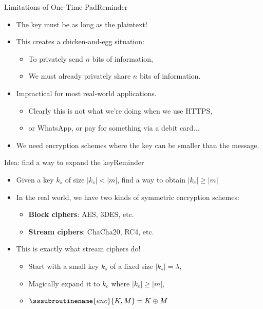 \documentclass[aspectratio=169, lualatex, handout]{beamer}
\begin{document}
\begin{frame}{Limitations of One-Time Pad}{Reminder}
	\begin{itemize}[<+->]
		\item The key must be as long as the plaintext!
		\item This creates a chicken-and-egg situation:
		      \begin{itemize}[<+->]
			      \item To privately send $n$ bits of information,
			      \item We must already privately share $n$ bits of information.
		      \end{itemize}
		\item Impractical for most real-world applications.
		      \begin{itemize}[<+->]
			      \item Clearly this is not what we're doing when we use HTTPS,
			      \item or WhatsApp, or pay for something via a debit card...
		      \end{itemize}
		\item We need encryption schemes where the key can be smaller than the message.
	\end{itemize}
\end{frame}

\begin{frame}{Idea: find a way to expand the key}{Reminder}
	\begin{itemize}[<+->]
		\item Given a key $k_s$ of size $\left|k_s\right| < \left|m\right|$, find a way to obtain $\left|k_e\right| \geq \left|m\right|$
		\item In the real world, we have two kinds of symmetric encryption schemes:
		      \begin{itemize}[<+->]
			      \item \textbf{Block ciphers}: AES, 3DES, etc.
			      \item \textbf{Stream ciphers}: ChaCha20, RC4, etc.
		      \end{itemize}
		\item This is exactly what stream ciphers do!
		      \begin{itemize}[<+->]
			      \item Start with a small key $k_s$ of a fixed size $\left|k_s\right| = \lambda$,
			      \item Magically expand it to $k_e$ where $\left|k_e\right| \geq \left|m\right|$,
			      \item $\sssubroutinename{enc}{K, M} = K \oplus M$
		      \end{itemize}
	\end{itemize}
\end{frame}
\end{document}
